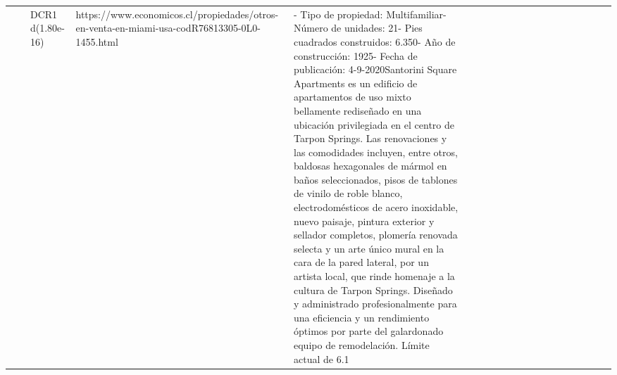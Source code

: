 \begin{table}[H]
\begin{tabular}{llllllllllrrrrllllrr}
 &  & DCR1 d(1.80e-16) & https://www.economicos.cl/propiedades/otros-en-venta-en-miami-usa-codR76813305-0L0-1455.html & - Tipo de propiedad: Multifamiliar- Número de unidades: 21- Pies cuadrados construidos: 6.350- Año de construcción: 1925- Fecha de publicación: 4-9-2020Santorini Square Apartments es un edificio de apartamentos de uso mixto bellamente rediseñado en una ubicación privilegiada en el centro de Tarpon Springs. Las renovaciones y las comodidades incluyen, entre otros, baldosas hexagonales de mármol en baños seleccionados, pisos de tablones de vinilo de roble blanco, electrodomésticos de acero inoxidable, nuevo paisaje, pintura exterior y sellador completos, plomería renovada selecta y un arte único mural en la cara de la pared lateral, por un artista local, que rinde homenaje a la cultura de Tarpon Springs. Diseñado y administrado profesionalmente para una eficiencia y un rendimiento óptimos por parte del galardonado equipo de remodelación. Límite actual de 6.1%

\end{tabular}
\end{table}
